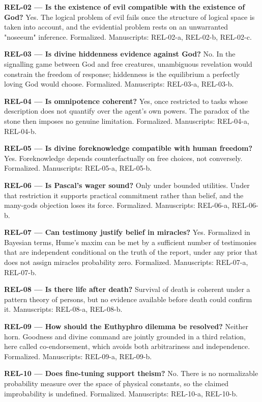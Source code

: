 \documentclass[10pt]{article}
\begin{document}
\textbf{REL-02 --- Is the existence of evil compatible with the existence of God?} Yes. The logical problem of evil fails once the structure of logical space is taken into account, and the evidential problem rests on an unwarranted "noseeum" inference. Formalized. Manuscripts: REL-02-a, REL-02-b, REL-02-c.

\textbf{REL-03 --- Is divine hiddenness evidence against God?} No. In the signalling game between God and free creatures, unambiguous revelation would constrain the freedom of response; hiddenness is the equilibrium a perfectly loving God would choose. Formalized. Manuscripts: REL-03-a, REL-03-b.

\textbf{REL-04 --- Is omnipotence coherent?} Yes, once restricted to tasks whose description does not quantify over the agent's own powers. The paradox of the stone then imposes no genuine limitation. Formalized. Manuscripts: REL-04-a, REL-04-b.

\textbf{REL-05 --- Is divine foreknowledge compatible with human freedom?} Yes. Foreknowledge depends counterfactually on free choices, not conversely. Formalized. Manuscripts: REL-05-a, REL-05-b.

\textbf{REL-06 --- Is Pascal's wager sound?} Only under bounded utilities. Under that restriction it supports practical commitment rather than belief, and the many-gods objection loses its force. Formalized. Manuscripts: REL-06-a, REL-06-b.

\textbf{REL-07 --- Can testimony justify belief in miracles?} Yes. Formalized in Bayesian terms, Hume's maxim can be met by a sufficient number of testimonies that are independent conditional on the truth of the report, under any prior that does not assign miracles probability zero. Formalized. Manuscripts: REL-07-a, REL-07-b.

\textbf{REL-08 --- Is there life after death?} Survival of death is coherent under a pattern theory of persons, but no evidence available before death could confirm it. Manuscripts: REL-08-a, REL-08-b.

\textbf{REL-09 --- How should the Euthyphro dilemma be resolved?} Neither horn. Goodness and divine command are jointly grounded in a third relation, here called co-endorsement, which avoids both arbitrariness and independence. Formalized. Manuscripts: REL-09-a, REL-09-b.

\textbf{REL-10 --- Does fine-tuning support theism?} No. There is no normalizable probability measure over the space of physical constants, so the claimed improbability is undefined. Formalized. Manuscripts: REL-10-a, REL-10-b.
\end{document}
